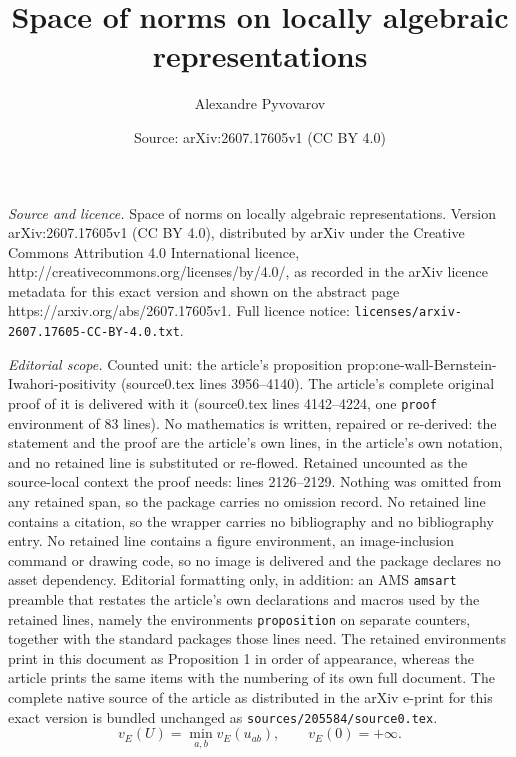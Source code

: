 \documentclass[10pt,a4paper]{amsart}
\title{Space of norms on locally algebraic representations}
\author{Alexandre Pyvovarov}
\date{Source: arXiv:2607.17605v1 (CC BY 4.0)}
\begin{document}
\maketitle

\noindent\emph{Source and licence.} Space of norms on locally algebraic representations. Version arXiv:2607.17605v1 (CC BY 4.0), distributed by arXiv under the Creative Commons Attribution 4.0 International licence, http://creativecommons.org/licenses/by/4.0/, as recorded in the arXiv licence metadata for this exact version and shown on the abstract page https://arxiv.org/abs/2607.17605v1. Full licence notice: \texttt{licenses/arxiv-2607.17605-CC-BY-4.0.txt}.\par\smallskip

\noindent\textit{Editorial scope.} Counted unit: the article's proposition prop:one-wall-Bernstein-Iwahori-positivity (source0.tex lines 3956--4140). The article's complete original proof of it is delivered with it (source0.tex lines 4142--4224, one \texttt{proof} environment of 83 lines). No mathematics is written, repaired or re-derived: the statement and the proof are the article's own lines, in the article's own notation, and no retained line is substituted or re-flowed.  Retained uncounted as the source-local context the proof needs: lines 2126--2129.  Nothing was omitted from any retained span, so the package carries no omission record.  No retained line contains a citation, so the wrapper carries no bibliography and no bibliography entry.  No retained line contains a figure environment, an image-inclusion command or drawing code, so no image is delivered and the package declares no asset dependency.  Editorial formatting only, in addition: an AMS \texttt{amsart} preamble that restates the article's own declarations and macros used by the retained lines, namely the environments \texttt{proposition} on separate counters, together with the standard packages those lines need.  The retained environments print in this document as Proposition 1 in order of appearance, whereas the article prints the same items with the numbering of its own full document.  The complete native source of the article as distributed in the arXiv e-print for this exact version is bundled unchanged as \texttt{sources/205584/source0.tex}.
\begin{equation}\label{eq:matrix-valuation-definition}
 v_E(U)=\min_{a,b}v_E(u_{ab}),
 \qquad v_E(0)=+\infty.
\end{equation}
\end{document}
